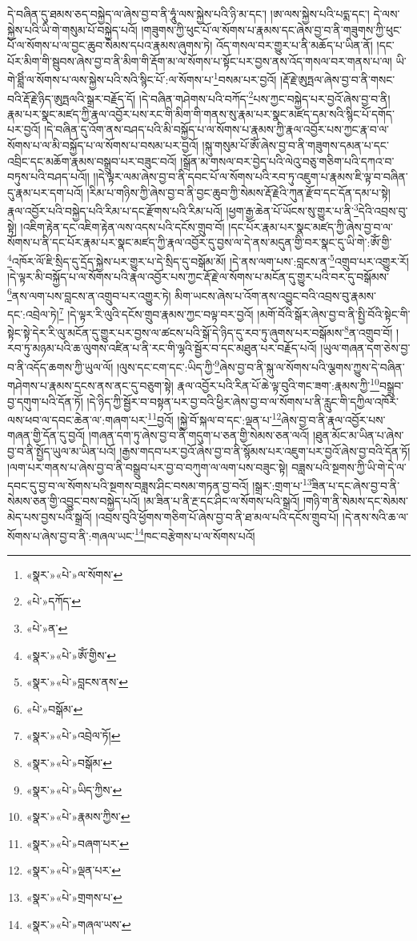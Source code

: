 དེ་བཞིན་དུ་ཐམས་ཅད་བསྐྱེད་ལ་ཞེས་བྱ་བ་ནི་ཧཱུཾ་ལས་སྐྱེས་པའི་ཉི་མ་དང་། །ཨ་ལས་སྐྱེས་པའི་པདྨ་དང་། དེ་ལས་སྐྱེས་པའི་ཡི་གེ་གསུམ་པོ་བསྐྱེད་པའོ། །གཟུགས་ཀྱི་ཕུང་པོ་ལ་སོགས་པ་རྣམས་དང་ཞེས་བྱ་བ་ནི་གཟུགས་ཀྱི་ཕུང་པོ་ལ་སོགས་པ་ལ་བྱང་ཆུབ་སེམས་དཔའ་རྣམས་ཞུགས་ཏེ། འོད་གསལ་བར་གྱུར་པ་ནི་མཆོད་པ་ཡིན་ནོ། །དང་པོར་མིག་གི་སྦུབས་ཞེས་བྱ་བ་ནི་མིག་གི་རྡོག་མ་ལ་སོགས་པ་སྟོང་པར་བྱས་ནས་འོད་གསལ་བར་གནས་པ་ལ། ཡི་གེ་ཐླིཾ་ལ་སོགས་པ་ལས་སྐྱེས་པའི་སའི་སྙིང་པོ་:ལ་སོགས་པ་\footnote{«སྣར་»«པེ་»ལ་སོགས་}བསམ་པར་བྱའོ། །རྡོ་རྗེ་ཨུཏྤལ་ཞེས་བྱ་བ་ནི་གསང་བའི་རྡོ་རྗེ་ཉིད་ཨུཏྤལའི་སྒྲར་བརྗོད་དོ། །དེ་བཞིན་གཤེགས་པའི་བཀོད་\footnote{«པེ་»དཀོད་}པས་ཀྱང་བསྐྱེད་པར་བྱའོ་ཞེས་བྱ་བ་ནི། རྣམ་པར་སྣང་མཛད་ཀྱི་རྣལ་འབྱོར་པས་རང་གི་མིག་གི་གནས་སུ་རྣམ་པར་སྣང་མཛད་དམ་སའི་སྙིང་པོ་དགོད་པར་བྱའོ། །དེ་བཞིན་དུ་འོག་ནས་བཤད་པའི་མི་བསྐྱོད་པ་ལ་སོགས་པ་རྣམས་ཀྱི་རྣལ་འབྱོར་པས་ཀྱང་རྣ་བ་ལ་སོགས་པ་ལ་མི་བསྐྱོད་པ་ལ་སོགས་པ་བསམ་པར་བྱའོ། །སྐུ་གསུམ་པོ་ཨོཾ་ཞེས་བྱ་བ་ནི་གཟུགས་དམན་པ་དང་འབྲིང་དང་མཆོག་རྣམས་བསྒྲུབ་པར་བཟུང་བའོ། །སྒྲོན་མ་གསལ་བར་བྱེད་པའི་ལེའུ་བཅུ་གཅིག་པའི་དཀའ་བ་བཏུས་པའི་བཤད་པའོ།། །།དེ་ལྟར་ལམ་ཞེས་བྱ་བ་ནི་དབང་པོ་ལ་སོགས་པའི་རབ་ཏུ་འཇུག་པ་རྣམས་ཇི་ལྟ་བ་བཞིན་དུ་རྣམ་པར་དག་པའོ། །རིམ་པ་གཉིས་ཀྱི་ཞེས་བྱ་བ་ནི་བྱང་ཆུབ་ཀྱི་སེམས་རྡོ་རྗེའི་ཀུན་རྫོབ་དང་དོན་དམ་པ་སྟེ། རྣལ་འབྱོར་པའི་བསྐྱེད་པའི་རིམ་པ་དང་རྫོགས་པའི་རིམ་པའོ། །ཕྱག་རྒྱ་ཆེན་པོ་ཡོངས་སུ་གྱུར་པ་ནི་\footnote{«པེ་»ན་}དེའི་འབྲས་བུ་སྟེ། །འཇིག་རྟེན་དང་འཇིག་རྟེན་ལས་འདས་པའི་དངོས་གྲུབ་བོ། །དང་པོར་རྣམ་པར་སྣང་མཛད་ཀྱི་ཞེས་བྱ་བ་ལ་སོགས་པ་ནི་དང་པོར་རྣམ་པར་སྣང་མཛད་ཀྱི་རྣལ་འབྱོར་དུ་བྱས་ལ་དེ་ནས་མདུན་གྱི་བར་སྣང་དུ་ཡི་གེ་:ཨོཾ་གྱི་\footnote{«སྣར་»«པེ་»ཨོཾ་གྱིས་}འཁོར་ལོ་ཇི་སྲིད་དུ་དྲོད་སྐྱེས་པར་གྱུར་པ་དེ་སྲིད་དུ་བསྒོམ་མོ། །དེ་ནས་ལག་པས་:བླངས་ན་\footnote{«སྣར་»«པེ་»བླངས་ནས་}འགྲུབ་པར་འགྱུར་རོ། །དེ་ལྟར་མི་བསྐྱོད་པ་ལ་སོགས་པའི་རྣལ་འབྱོར་པས་ཀྱང་རྡོ་རྗེ་ལ་སོགས་པ་མངོན་དུ་གྱུར་པའི་བར་དུ་བསྒོམས་\footnote{«པེ་»བསྒོམ་}ནས་ལག་པས་བླངས་ན་འགྲུབ་པར་འགྱུར་ཏེ། མིག་ཡངས་ཞེས་པ་འོག་ནས་འབྱུང་བའི་འབྲས་བུ་རྣམས་དང་:འབྲེལ་ཏེ།\footnote{«སྣར་»«པེ་»འབྲེལ་ཏོ།} །དེ་ལྟར་རི་ལུའི་དངོས་གྲུབ་རྣམས་ཀྱང་བལྟ་བར་བྱའོ། །མགོ་བོའི་སྒོར་ཞེས་བྱ་བ་ནི་སྤྱི་བོའི་སྟེང་གི་སྟེང་སྟེ་དེར་རི་ལུ་མངོན་དུ་གྱུར་པར་བྱས་ལ་ཚངས་པའི་སྒོ་དེ་ཉིད་དུ་རབ་ཏུ་ཞུགས་པར་བསྒོམས་\footnote{«སྣར་»«པེ་»བསྒོམ་}ན་འགྲུབ་བོ། །རབ་ཏུ་མཉམ་པའི་ཆ་ལུགས་འཛིན་པ་ནི་རང་གི་ལྷའི་སྦྱོར་བ་དང་མཐུན་པར་བརྗོད་པའོ། །ཡུལ་གཞན་དག་ཅེས་བྱ་བ་ནི་འདོད་ཆགས་ཀྱི་ཡུལ་ལོ། །ལུས་དང་ངག་དང་:ཡིད་ཀྱི་\footnote{«སྣར་»«པེ་»ཡིད་ཀྱིས་}ཞེས་བྱ་བ་ནི་སྐུ་ལ་སོགས་པའི་ལྕགས་ཀྱུས་དེ་བཞིན་གཤེགས་པ་རྣམས་དྲངས་ནས་ནང་དུ་བཅུག་སྟེ། རྣལ་འབྱོར་པའི་རིན་པོ་ཆེ་ལྟ་བུའི་གང་ཟག་:རྣམས་ཀྱི་\footnote{«སྣར་»«པེ་»རྣམས་ཀྱིས་}བསྒྲུབ་བྱ་དགུག་པའི་དོན་ཏོ། །དེ་ཉིད་ཀྱི་སྦྱོར་བ་བསྟན་པར་བྱ་བའི་ཕྱིར་ཞེས་བྱ་བ་ལ་སོགས་པ་ནི་རླུང་གི་དཀྱིལ་འཁོར་ལས་ཕབ་ལ་དབང་ཆེན་ལ་:གཞག་པར་\footnote{«སྣར་»«པེ་»བཞག་པར་}བྱའོ། །སྐྱེ་བོ་སྐལ་བ་དང་:ལྡན་པ་\footnote{«སྣར་»«པེ་»ལྡན་པར་}ཞེས་བྱ་བ་ནི་རྣལ་འབྱོར་པས་གཞན་གྱི་དོན་དུ་བྱའོ། །གཞན་དག་ཏུ་ཞེས་བྱ་བ་ནི་གདུག་པ་ཅན་གྱི་སེམས་ཅན་ལའོ། །ཐུན་མོང་མ་ཡིན་པ་ཞེས་བྱ་བ་ནི་སྤྱོད་ཡུལ་མ་ཡིན་པའོ། །རྒྱས་གདབ་པར་བྱའོ་ཞེས་བྱ་བ་ནི་སྙོམས་པར་འཇུག་པར་བྱའོ་ཞེས་བྱ་བའི་དོན་ཏོ། །ལག་པར་གནས་པ་ཞེས་བྱ་བ་ནི་བསྒྲུབ་པར་བྱ་བ་བཀུག་ལ་ལག་པས་བཟུང་སྟེ། བཟླས་པའི་སྔགས་ཀྱི་ཡི་གེ་དེ་ལ་དབང་དུ་བྱ་བ་ལ་སོགས་པའི་སྔགས་བཟླས་ཤིང་བསམ་གཏན་བྱ་བའོ། །སྒྲར་:གྲག་པ་\footnote{«སྣར་»«པེ་»གྲགས་པ་}ཟིན་པ་དང་ཞེས་བྱ་བ་ནི་སེམས་ཅན་གྱི་འབྱུང་བས་བསྐྱེད་པའོ། །མ་ཟིན་པ་ནི་རྔ་དང་ཤིང་ལ་སོགས་པའི་སྒྲའོ། །གཉི་ག་ནི་སེམས་དང་སེམས་མེད་པས་བྱས་པའི་སྒྲའོ། །འབྲས་བུའི་ཕྱོགས་གཅིག་པོ་ཞེས་བྱ་བ་ནི་ཐ་མལ་པའི་དངོས་གྲུབ་པོ། །དེ་ནས་སའི་ཆ་ལ་སོགས་པ་ཞེས་བྱ་བ་ནི་:གཞལ་ཡང་\footnote{«སྣར་»«པེ་»གཞལ་ཡས་}ཁང་བརྩེགས་པ་ལ་སོགས་པའོ། 